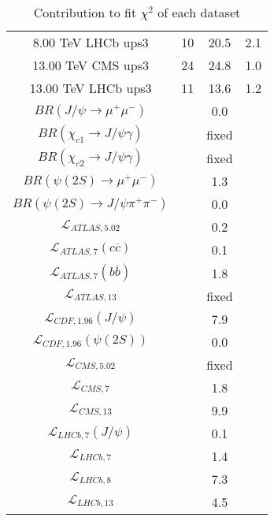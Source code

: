 \begin{table}[h!]
\begin{tabular}{c|c|c|c}
8.00 TeV LHCb ups3 & 10 & 20.5 & 2.1 \\
13.00 TeV CMS ups3 & 24 & 24.8 & 1.0 \\
13.00 TeV LHCb ups3 & 11 & 13.6 & 1.2 \\
\hline
$BR(J/\psi\rightarrow\mu^+\mu^-)$ &  & 0.0 &  \\
$BR(\chi_{c1}\rightarrow J/\psi\gamma)$ &  & fixed & \\
$BR(\chi_{c2}\rightarrow J/\psi\gamma)$ &  & fixed & \\
$BR(\psi(2S)\rightarrow\mu^+\mu^-)$ &  & 1.3 &  \\
$BR(\psi(2S)\rightarrow J/\psi\pi^+\pi^-)$ &  & 0.0 &  \\
$\mathcal L_{ATLAS,5.02}$ &  & 0.2 &  \\
$\mathcal L_{ATLAS,7}(c\overline c)$ &  & 0.1 &  \\
$\mathcal L_{ATLAS,7}(b\overline b)$ &  & 1.8 &  \\
$\mathcal L_{ATLAS,13}$ &  & fixed & \\
$\mathcal L_{CDF,1.96}(J/\psi)$ &  & 7.9 &  \\
$\mathcal L_{CDF,1.96}(\psi(2S))$ &  & 0.0 &  \\
$\mathcal L_{CMS,5.02}$ &  & fixed & \\
$\mathcal L_{CMS,7}$ &  & 1.8 &  \\
$\mathcal L_{CMS,13}$ &  & 9.9 &  \\
$\mathcal L_{LHCb,7}(J/\psi)$ &  & 0.1 &  \\
$\mathcal L_{LHCb,7}$ &  & 1.4 &  \\
$\mathcal L_{LHCb,8}$ &  & 7.3 &  \\
$\mathcal L_{LHCb,13}$ &  & 4.5 &  \\
\end{tabular}
\caption{Contribution to fit $\chi^2$ of each dataset}
\end{table}

